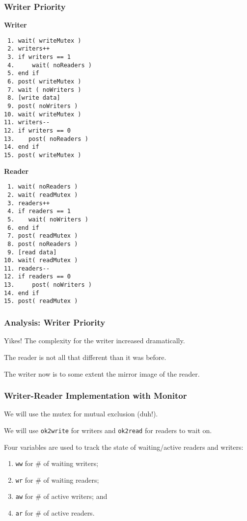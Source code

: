 \begin{frame}[fragile]
	\frametitle{Writer Priority}

	\begin{multicols}{2}
		\small
		\textbf{Writer}
		\begin{verbatim}
 1. wait( writeMutex )
 2. writers++
 3. if writers == 1
 4.     wait( noReaders )
 5. end if
 6. post( writeMutex )
 7. wait ( noWriters )
 8. [write data]
 9. post( noWriters )
10. wait( writeMutex )
11. writers--
12. if writers == 0
13.    post( noReaders )
14. end if
15. post( writeMutex )
  		\end{verbatim}
		\columnbreak
		\textbf{Reader}\vspace{-2em}
		\begin{verbatim}
 1. wait( noReaders )
 2. wait( readMutex )
 3. readers++
 4. if readers == 1
 5.    wait( noWriters )
 6. end if
 7. post( readMutex )
 8. post( noReaders )
 9. [read data]
10. wait( readMutex )
11. readers--
12. if readers == 0
13.     post( noWriters )
14. end if
15. post( readMutex )

		\end{verbatim}
	\end{multicols}

\end{frame}


\begin{frame}
	\frametitle{Analysis: Writer Priority}

	Yikes! The complexity for the writer increased dramatically.

	The reader is not all that different than it was before.

	The writer now is to some extent the mirror image of the reader.

\end{frame}


\begin{frame}
	\frametitle{Writer-Reader Implementation with Monitor}

	We will use the mutex for mutual exclusion (duh!).

	We will use \texttt{ok2write} for writers and \texttt{ok2read} for readers to wait on.

	Four variables are used to track the state of waiting/active readers and writers:

	\begin{enumerate}
		\item \texttt{ww} for \# of waiting writers;
		\item \texttt{wr} for \# of waiting readers;
		\item \texttt{aw} for \# of active writers; and
		\item \texttt{ar} for \# of active readers.
	\end{enumerate}

\end{frame}


